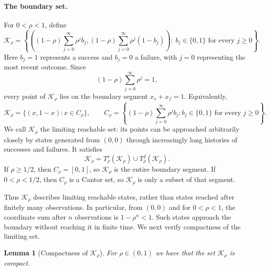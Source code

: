 \documentclass[11pt]{article}
\newtheorem{lemma}{Lemma}
\begin{document}
\paragraph{The boundary set.}
For $0<\rho<1$, define
\begin{equation}
\mathcal K_\rho=
\left\{
\left((1-\rho)\sum_{j=0}^{\infty}\rho^j b_j,
      (1-\rho)\sum_{j=0}^{\infty}\rho^j(1-b_j)\right)
:\ b_j\in\{0,1\}\text{ for every }j\geq0
\right\}.
\end{equation}
Here $b_j=1$ represents a success and $b_j=0$ a failure, with $j=0$
representing the most recent outcome. Since
\begin{equation*}
(1-\rho)\sum_{j=0}^{\infty}\rho^j=1,
\end{equation*}
every point of $\mathcal K_\rho$ lies on the boundary segment
$x_s+x_f=1$. Equivalently,
\begin{equation}
\mathcal K_\rho=\{(x,1-x):x\in C_\rho\},
\qquad
C_\rho=\left\{(1-\rho)\sum_{j=0}^{\infty}\rho^j b_j:
b_j\in\{0,1\}\text{ for every }j\geq0\right\}.
\end{equation}
We call $\mathcal K_\rho$ the limiting reachable set: its points can be
approached arbitrarily closely by states generated from $(0,0)$ through
increasingly long histories of successes and failures. It satisfies
\begin{equation}
\mathcal K_\rho=T_\rho^s(\mathcal K_\rho)\cup T_\rho^f(\mathcal K_\rho).
\end{equation}
If $\rho\geq1/2$, then $C_\rho=[0,1]$, so $\mathcal K_\rho$ is the
entire boundary segment. If $0<\rho<1/2$, then $C_\rho$ is a Cantor set,
so $\mathcal K_\rho$ is only a subset of that segment.

Thus $\mathcal K_\rho$ describes limiting reachable states, rather than
states reached after finitely many observations. In particular, from
$(0,0)$ and for $0<\rho<1$, the coordinate sum after $n$ observations is
$1-\rho^n<1$. Such states approach the boundary without reaching it in
finite time. We next verify compactness of the limiting set.

\begin{lemma}[Compactness of $\mathcal{K}_\rho$] For $\rho \in (0,1)$ we have that the set $\mathcal{K}_\rho$ is compact. 
\end{lemma}
\end{document}
